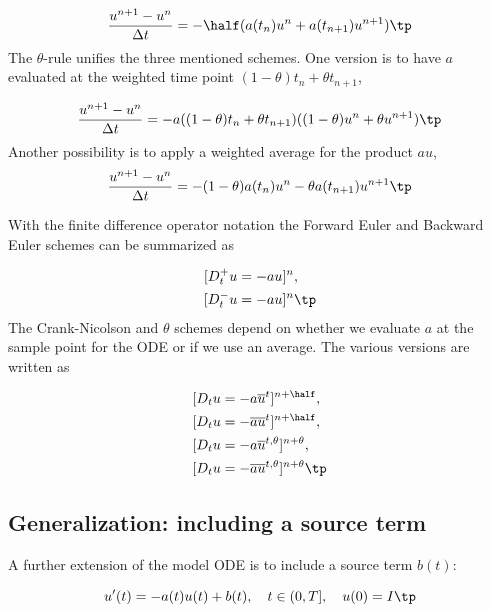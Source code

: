 \documentclass[graybox,sectrefs,envcountresetchap,open=right,final]{svmonodo}
\begin{document}
\begin{equation}
\frac{u^{n+1} - u^{n}}{\Delta t} = -\half(a(t_n)u^n + a(t_{n+1})u^{n+1})
\tp
\end{equation}
The $\theta$-rule unifies the three mentioned schemes. One version is to
have $a$ evaluated at the weighted time point $(1-\theta)t_n + \theta t_{n+1}$,

\begin{equation}
\frac{u^{n+1} - u^{n}}{\Delta t} = -a((1-\theta)t_n + \theta t_{n+1})((1-\theta) u^n + \theta u^{n+1})
\tp
\end{equation}
Another possibility is to apply a weighted average for the product $au$,
\begin{equation}
\frac{u^{n+1} - u^{n}}{\Delta t} = -(1-\theta) a(t_n)u^n - \theta
a(t_{n+1})u^{n+1}
\tp
\end{equation}

With the finite difference operator notation the Forward Euler and Backward
Euler schemes can be summarized as

\begin{align}
\lbrack D^+_t u &= -au\rbrack^n,\\ 
\lbrack D^-_t u &= -au\rbrack^n
\tp
\end{align}
The Crank-Nicolson and $\theta$ schemes depend on whether we evaluate
$a$ at the sample point for the ODE or if we use an average. The
various versions are written as

\begin{align}
\lbrack D_t u &= -a\overline{u}^t\rbrack^{n+\half},\\ 
\lbrack D_t u &= -\overline{au}^t\rbrack^{n+\half},\\ 
\lbrack D_t u &= -a\overline{u}^{t,\theta}\rbrack^{n+\theta},\\ 
\lbrack D_t u &= -\overline{au}^{t,\theta}\rbrack^{n+\theta}
\tp
\end{align}


\subsection{Generalization: including a source term}
\label{decay:source}

A further extension of the model ODE is to include a source term $b(t)$:

\begin{equation}
u^{\prime}(t) = -a(t)u(t) + b(t),\quad t\in (0,T],\quad u(0)=I
\tp
\label{decay:problem:ab}
\end{equation}
\end{document}
